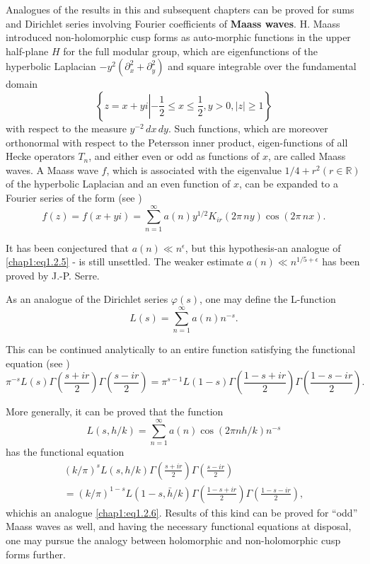 Analogues of the results in this and subsequent chapters can be proved
for sums and Dirichlet series involving Fourier coefficients of {\bf
Maass waves}. H. Maass \cite{key21} introduced non-holomorphic cusp
forms as auto-morphic functions in the upper half-plane $H$ for the
full modular group, which are eigenfunctions of the hyperbolic
Laplacian $-y^2(\partial_x^2+\partial_y^2)$ and square integrable over
the fundamental domain
$$
\left\{z=x+yi\left|-\frac{1}{2}\right.\leq x \leq\frac{1}{2},y>0,|z|
\geq 1\right\} 
$$\pageoriginale
with respect to the measure $y^{-2}\,dx\,dy$. Such functions, which
are moreover orthonormal with respect to the Petersson inner product,
eigen-functions of all Hecke operators $T_n$, and either even or odd
as functions of $x$, are called Maass waves. A Maass wave $f$, which
is associated with the eigenvalue $1/4+r^2(r\in\mathbb{R})$ of the
hyperbolic Laplacian and an even function of $x$, can be expanded to a
Fourier series of the form (see \cite{key20})
$$
f(z)=f(x+yi)=\sum\limits_{n=1}^\infty a(n)y^{1/2}K_{ir}(2\pi\,ny) \cos
(2\pi\,nx).
$$

It has been conjectured that $a(n)\ll n^\epsilon$, but this hypothesis-an
analogue of \eqref{chap1:eq1.2.5} - is still unsettled. The weaker
estimate $a(n)\ll n^{1/5+\epsilon}$ has been proved by J.-P. Serre.

As an analogue of the Dirichlet series $\varphi(s)$, one may define
the L-function
$$
L(s)=\sum\limits_{n=1}^\infty a(n)n^{-s}.
$$

This can be continued analytically to an entire function satisfying
the functional equation (see \cite{key7})
$$
\pi^{-s}L(s)\Gamma\left(\frac{s+ir}{2}\right)\Gamma\left(\frac{s-ir}{2}
\right)= \pi^{s-1}L(1-s)\Gamma\left(\frac{1-s+ir}{2}\right)\Gamma
\left(\frac{1-s-ir}{2}\right).
$$

More generally, it can be proved that the function
$$
L(s,h/k)=\sum\limits_{n=1}^\infty a(n)\cos(2\pi nh/k)n^{-s}
$$
has the functional equation
\begin{multline*}
(k/\pi)^sL(s,h/k)\Gamma\left(\frac{s+ir}{2}\right)\Gamma\left(
\frac{s-ir}{2}\right)\\
=(k/\pi)^{1-s}L(1-s,\bar{h}/k)\Gamma\left(
\frac{1-s+ir}{2}\right)\Gamma\left(\frac{1-s-ir}{2}\right),
\end{multline*}
which\pageoriginale is an analogue \eqref{chap1:eq1.2.6}. Results of
this kind can be proved for ``odd'' Maass waves as well, and having
the necessary functional equations at disposal, one may pursue the
analogy between holomorphic and non-holomorphic cusp forms further. 

